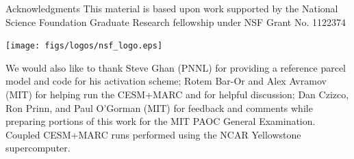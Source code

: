 \documentclass[9pt,pdf,mathserif]{beamer}
\begin{document}
\begin{frame}{Acknowledgments}
This material is based upon work supported by the National Science Foundation Graduate Research fellowship under NSF Grant No. 1122374\\

\begin{center}
\texttt{[image: figs/logos/nsf\_logo.eps]}\\
\end{center}

We would also like to thank Steve Ghan (PNNL) for providing a reference parcel model and code for his activation scheme; Rotem Bar-Or and Alex Avramov (MIT) for helping run the CESM+MARC and for helpful discussion; Dan Czizco, Ron Prinn, and Paul O'Gorman (MIT) for feedback and comments while preparing portions of this work for the MIT PAOC General Examination.\\
\vspace{0.5cm}
Coupled CESM+MARC runs performed using the NCAR Yellowstone supercomputer.
\end{frame}
\end{document}
